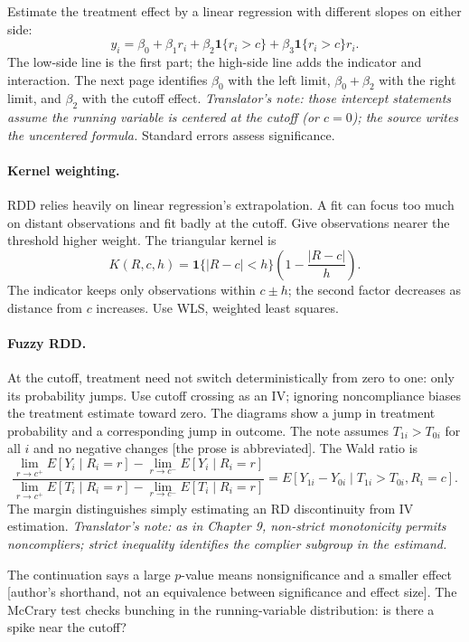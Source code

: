 Estimate the treatment effect by a linear regression with different slopes on either side:
\[y_i=\beta_0+\beta_1r_i+\beta_2\mathbf1\{r_i>c\}+\beta_3\mathbf1\{r_i>c\}r_i.\]
The low-side line is the first part; the high-side line adds the indicator and interaction. The next page identifies $\beta_0$ with the left limit, $\beta_0+\beta_2$ with the right limit, and $\beta_2$ with the cutoff effect. \textit{Translator's note: those intercept statements assume the running variable is centered at the cutoff (or $c=0$); the source writes the uncentered formula.} Standard errors assess significance.

\paragraph{Kernel weighting.}
RDD relies heavily on linear regression's extrapolation. A fit can focus too much on distant observations and fit badly at the cutoff. Give observations nearer the threshold higher weight. The triangular kernel is
\[K(R,c,h)=\mathbf1\{|R-c|<h\}\left(1-\frac{|R-c|}{h}\right).\]
The indicator keeps only observations within $c\pm h$; the second factor decreases as distance from $c$ increases. Use WLS, weighted least squares.

\paragraph{Fuzzy RDD.}
At the cutoff, treatment need not switch deterministically from zero to one: only its probability jumps. Use cutoff crossing as an IV; ignoring noncompliance biases the treatment estimate toward zero. The diagrams show a jump in treatment probability and a corresponding jump in outcome. The note assumes $T_{1i}>T_{0i}$ for all $i$ and no negative changes [the prose is abbreviated]. The Wald ratio is
\[
\frac{\lim_{r\to c^+}E[Y_i\mid R_i=r]-\lim_{r\to c^-}E[Y_i\mid R_i=r]}
{\lim_{r\to c^+}E[T_i\mid R_i=r]-\lim_{r\to c^-}E[T_i\mid R_i=r]}
=E[Y_{1i}-Y_{0i}\mid T_{1i}>T_{0i},R_i=c].
\]
The margin distinguishes simply estimating an RD discontinuity from IV estimation. \textit{Translator's note: as in Chapter 9, non-strict monotonicity permits noncompliers; strict inequality identifies the complier subgroup in the estimand.}

The continuation says a large $p$-value means nonsignificance and a smaller effect [author's shorthand, not an equivalence between significance and effect size]. The McCrary test checks bunching in the running-variable distribution: is there a spike near the cutoff?

